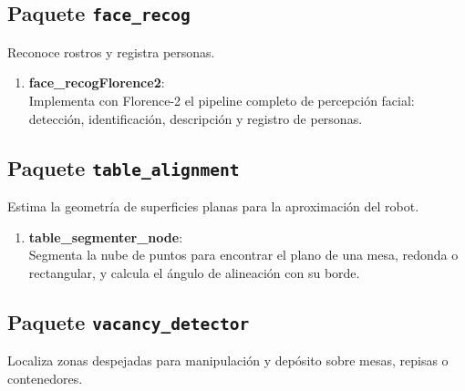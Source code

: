 \subsection{Paquete \texttt{face\_recog}}
Reconoce rostros y registra personas.

\begin{enumerate}
    \item \textbf{face\_recogFlorence2}: \\
    Implementa con Florence-2 el pipeline completo de percepción facial: detección, identificación, descripción y registro de personas.
\end{enumerate}

\subsection{Paquete \texttt{table\_alignment}}
Estima la geometría de superficies planas para la aproximación del robot.

\begin{enumerate}
    \item \textbf{table\_segmenter\_node}: \\
    Segmenta la nube de puntos para encontrar el plano de una mesa, redonda o rectangular, y calcula el ángulo de alineación con su borde.
\end{enumerate}

\subsection{Paquete \texttt{vacancy\_detector}}
Localiza zonas despejadas para manipulación y depósito sobre mesas, repisas o contenedores.

